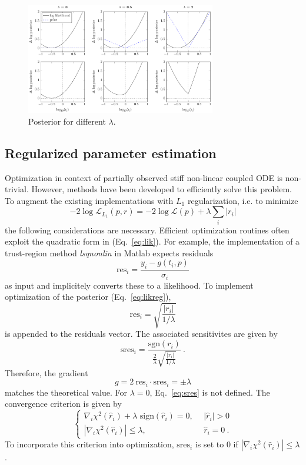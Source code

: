 \documentclass{bioinfo}
\begin{document}
\begin{figure}[!tpb]%
\centerline{\includegraphics[width=235pt]{Figures/l1_cartoon_priorstrength.pdf}}
\caption{Posterior for different $\lambda$.}\label{fig:01}
\end{figure}

\subsection{Regularized parameter estimation}
Optimization in context of partially observed stiff non-linear coupled ODE is non-trivial.
However, methods have been developed to efficiently solve this problem.
To augment the existing implementations with $L_1$ regularization, i.e. to minimize
\begin{equation}
	-2\log \mathcal L_{L_1}(p,r) = -2\log \mathcal L(p) + \lambda \sum_i |r_i|
\end{equation}
the following considerations are necessary.
Efficient optimization routines often exploit the quadratic form in (Eq.~\ref{eq:lik}).
For example, the implementation of a trust-region method \textit{lsqnonlin} in Matlab expects residuals
\begin{equation}
	\text{res}_i = \frac{y_i-g(t_i,p)}{\sigma_i}
\end{equation}
as input and implicitely converts these to a likelihood.
To implement optimization of the posterior (Eq.~\ref{eq:likreg}),
\begin{equation}
	\text{res}_i = \sqrt{\frac{|r_i|}{1/\lambda}}
\end{equation}
is appended to the residuals vector.
The associated sensitivites are given by
\begin{equation}
	\text{sres}_i = \frac{\text{sgn}(r_i)}{\frac{2}{\lambda}\sqrt{\frac{|r_i|}{1/\lambda}}} \:.\label{eq:sres}
\end{equation}
Therefore, the gradient
\begin{equation}
	g = 2 \: \text{res}_i \cdot \text{sres}_i = \pm \lambda
\end{equation}
matches the theoretical value.
For $\lambda = 0$, Eq.~\ref{eq:sres} is not defined.
The convergence criterion is given by
\begin{equation}
	\begin{cases}
	\nabla_i \chi^2(\hat r_i) + \lambda \text{ sign}(\hat r_i) = 0, \:\:& |\hat r_i| > 0\\
	|\nabla_i \chi^2(\hat r_i)| \le \lambda, \:\:&\hat r_i = 0 \:.
	\end{cases}
\end{equation}
To incorporate this criterion into optimization, $\text{sres}_i$ is set to $0$ if $|\nabla_i \chi^2(\hat r_i)| \le \lambda$.\\
\end{document}
